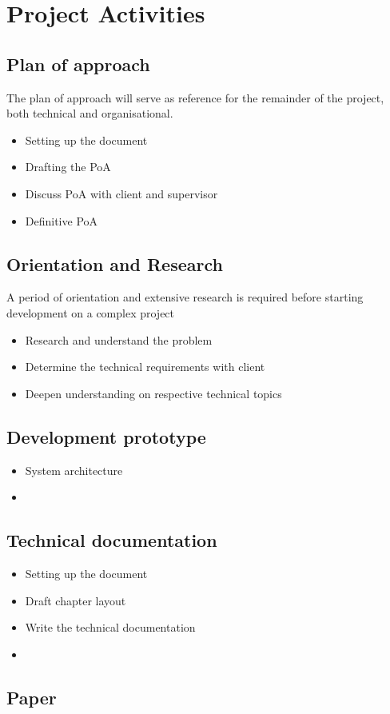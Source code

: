 \chapter{Project Activities}

\section{Plan of approach}
The plan of approach will serve as reference for the remainder of the project, both technical and organisational.
\begin{itemize}
    \item Setting up the document
    \item Drafting the PoA
    \item Discuss PoA with client and supervisor
    \item Definitive PoA
\end{itemize}
\section{Orientation and Research}
A period of orientation and extensive research is required before starting development on a complex project
\begin{itemize}
    \item Research and understand the problem
    \item Determine the technical requirements with client
    \item Deepen understanding on respective technical topics
\end{itemize}
\section{Development prototype}
\begin{itemize}
    \item System architecture
    \item 
\end{itemize}
\section{Technical documentation}
\begin{itemize}        
    \item Setting up the document
    \item Draft chapter layout
    \item Write the technical documentation
    \item 
\end{itemize}
\section{Paper}
